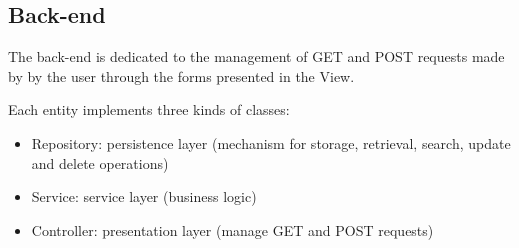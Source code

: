 \documentclass{article}
\begin{document}
\begin{multicols*}{2}
\subsection*{Back-end}
The back-end is dedicated to the management of GET and POST requests made by by the user through the forms presented in the View.

Each entity implements three kinds of classes:
\begin{itemize}
    \item Repository: persistence layer (mechanism for storage, retrieval, search, update and delete operations)
    \item Service: service layer (business logic)
    \item Controller: presentation layer (manage GET and POST requests)
\end{itemize}
\end{multicols*}
\end{document}
